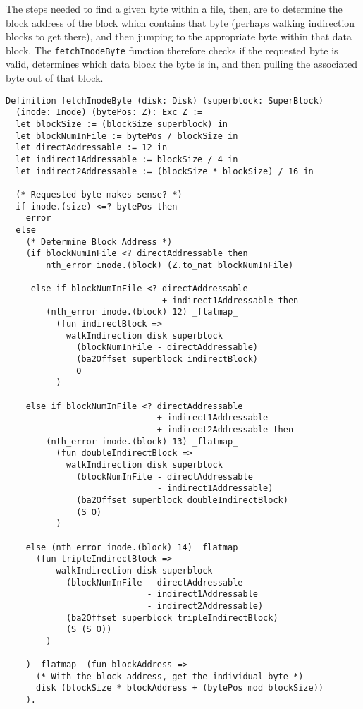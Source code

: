 \documentclass[nocopyrightspace]{sigplanconf}
\begin{document}
The steps needed to find a given byte within a file, then, are to determine
the block address of the block which contains that byte (perhaps walking
indirection blocks to get there), and then jumping to the appropriate byte
within that data block. The {\tt fetchInodeByte} function therefore checks if
the requested byte is valid, determines which data block the byte is in, and
then pulling the associated byte out of that block.

\begin{lstlisting}
Definition fetchInodeByte (disk: Disk) (superblock: SuperBlock)
  (inode: Inode) (bytePos: Z): Exc Z :=
  let blockSize := (blockSize superblock) in
  let blockNumInFile := bytePos / blockSize in
  let directAddressable := 12 in
  let indirect1Addressable := blockSize / 4 in
  let indirect2Addressable := (blockSize * blockSize) / 16 in

  (* Requested byte makes sense? *)
  if inode.(size) <=? bytePos then 
    error
  else 
    (* Determine Block Address *)
    (if blockNumInFile <? directAddressable then
        nth_error inode.(block) (Z.to_nat blockNumInFile)

     else if blockNumInFile <? directAddressable
                               + indirect1Addressable then
        (nth_error inode.(block) 12) _flatmap_ 
          (fun indirectBlock =>
            walkIndirection disk superblock
              (blockNumInFile - directAddressable)
              (ba2Offset superblock indirectBlock) 
              O
          )

    else if blockNumInFile <? directAddressable
                              + indirect1Addressable
                              + indirect2Addressable then
        (nth_error inode.(block) 13) _flatmap_ 
          (fun doubleIndirectBlock =>
            walkIndirection disk superblock 
              (blockNumInFile - directAddressable
                              - indirect1Addressable)
              (ba2Offset superblock doubleIndirectBlock)
              (S O)
          )

    else (nth_error inode.(block) 14) _flatmap_ 
      (fun tripleIndirectBlock =>
          walkIndirection disk superblock 
            (blockNumInFile - directAddressable
                            - indirect1Addressable
                            - indirect2Addressable)
            (ba2Offset superblock tripleIndirectBlock) 
            (S (S O))
        )

    ) _flatmap_ (fun blockAddress =>
      (* With the block address, get the individual byte *)
      disk (blockSize * blockAddress + (bytePos mod blockSize))
    ).
\end{lstlisting}
\end{document}

